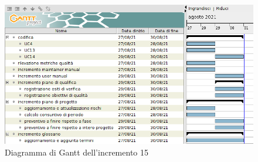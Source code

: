 \begin{figure}[!ht]
    \caption{Diagramma di Gantt dell'incremento 15}
    \vspace{5px}
    \includegraphics[scale=0.3]{../../../Images/Diagrammi/Gantt/incremento15.png}
    \centering
\end{figure}

